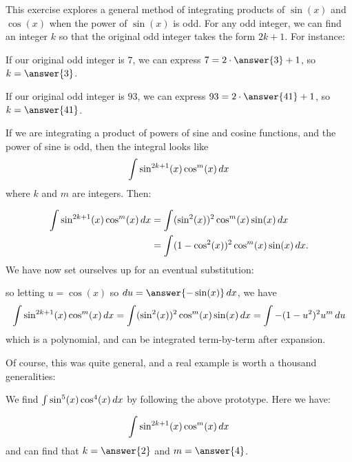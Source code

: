 \documentclass{ximera}
\author{Jim Talamo and Bart Snapp}
\begin{document}
\begin{exercise}

This exercise explores a general method of integrating products of $\sin(x)$ and $\cos(x)$ when the power of $\sin(x)$ is odd.  For any odd integer, we can find an integer $k$ so that the original odd integer takes the form $2k+1$.  For instance:

\begin{exercise}
If our original odd integer is $7$, we can express $7 = 2 \cdot \answer{3}+1$, so $k=\answer{3}$.

If our original odd integer is $93$, we can express $93 = 2 \cdot \answer{41}+1$, so $k=\answer{41}$.
\end{exercise}

 If we are integrating a product of powers of sine and cosine functions, and the power of sine is odd, then the integral looks like
\[
\int \sin^{2k+1}(x) \cos^m(x) \mathop{}\!d x
\]
where $k$ and $m$ are integers.  Then:

\begin{align*}
  \int \sin^{2k+1}(x) \cos^m(x) \mathop{}\!d x &=\int(\sin^{2}(x))^2 \cos^m(x) \sin(x) \mathop{}\!d x\\
  &= \int (1-\cos^2(x))^2 \cos^m(x) \sin(x)\mathop{}\!d x.
\end{align*}
We have now set ourselves up for an eventual substitution:
\begin{center}%
\end{center}
so letting $u = \cos(x)$ so $\d u =\answer{-\sin(x)} \d x$, we have
\[
  \int \sin^{2k+1}(x) \cos^m(x) \mathop{}\!d x =\int(\sin^{2}(x))^2 \cos^m(x) \sin(x) \mathop{}\!d x = \int -(1-u^2)^2 u^m \mathop{}\!d u
\]
which is a polynomial, and can be integrated term-by-term after expansion.

Of course, this was quite general, and a real example is worth a thousand generalities:

\begin{exercise}
We find $\int \sin^5(x) \cos^4(x) \mathop{}\!d x$ by following the above prototype.  Here we have:

\[
\int \sin^{2k+1}(x) \cos^m(x) \mathop{}\!d x
\]
and can find that $k=\answer{2}$ and $m=\answer{4}$.


\end{exercise}
\end{exercise}
\end{document}
